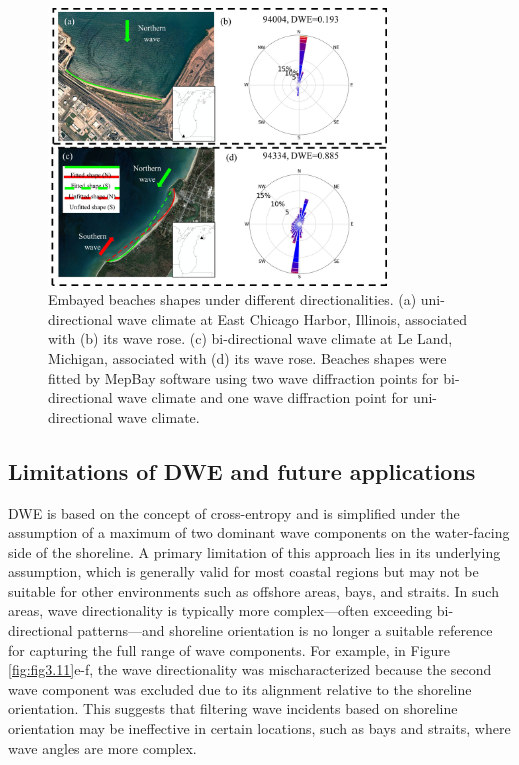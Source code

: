 \begin{figure}[htbp]
  \centering
  \includegraphics[width=0.8\textwidth]{chapter3/resources/figure3-12.jpg}
  \caption{Embayed beaches shapes under different directionalities. (a) uni-directional wave climate at East Chicago Harbor, Illinois, associated with (b) its wave rose. (c) bi-directional wave climate at Le Land, Michigan, associated with (d) its wave rose. Beaches shapes were fitted by MepBay software using two wave diffraction points for bi-directional wave climate and one wave diffraction point for uni-directional wave climate.}
  \label{fig:fig3.12}
\end{figure}

\subsection{Limitations of DWE and future applications}
\label{c3_Limitations of DWE and future applications}

DWE is based on the concept of cross-entropy and is simplified under the
assumption of a maximum of two dominant wave components on the water-facing side
of the shoreline. A primary limitation of this approach lies in its underlying
assumption, which is generally valid for most coastal regions but may not be
suitable for other environments such as offshore areas, bays, and straits. In
such areas, wave directionality is typically more complex—often exceeding
bi-directional patterns—and shoreline orientation is no longer a suitable
reference for capturing the full range of wave components. For example, in
Figure \ref{fig:fig3.11}e-f, the wave directionality was
mischaracterized because the second wave component was excluded due to its
alignment relative to the shoreline orientation. This suggests that filtering
wave incidents based on shoreline orientation may be ineffective in certain
locations, such as bays and straits, where wave angles are more complex.

